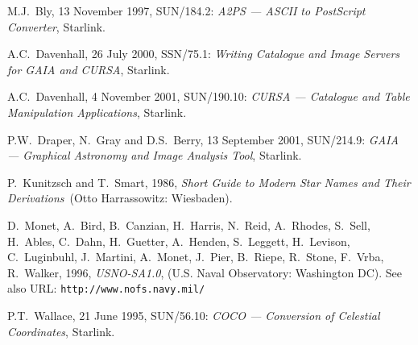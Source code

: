 \documentclass[twoside,11pt]{article}
\newcommand{\htmladdnormallink}[2]{#1}
\newcommand{\xref}[3]{#1}
\renewcommand{\_}{\texttt{\symbol{95}}}
\begin{document}
% 
{}
\begin{thebibliography}{99}

   M.J.~Bly, 13 November 1997,
   \xref{SUN/184.2}{sun184}{}: {\it A2PS --- ASCII to PostScript Converter},
   Starlink.

   A.C.~Davenhall, 26 July 2000,
   \xref{SSN/75.1}{ssn75}{}: {\it Writing Catalogue and Image Servers for
   GAIA and CURSA}, Starlink.

   A.C.~Davenhall, 4 November 2001,
   \xref{SUN/190.10}{sun190}{}: {\it CURSA --- Catalogue and Table
   Manipulation Applications}, Starlink.

   P.W.~Draper, N.~Gray and D.S.~Berry, 13 September 2001,
   \xref{SUN/214.9}{sun214}{}: {\it GAIA --- Graphical Astronomy and
   Image Analysis Tool}, Starlink.

   P.~Kunitzsch and T.~Smart, 1986, {\it Short
   Guide to Modern Star Names and Their Derivations}\, (Otto Harrassowitz:
   Wiesbaden).

   D.~Monet, A.~Bird, B.~Canzian, H.~Harris, N.~Reid,
   A.~Rhodes, S.~Sell, H.~Ables, C.~Dahn, H.~Guetter, A.~Henden,
   S.~Leggett, H.~Levison, C.~Luginbuhl, J.~Martini, A.~Monet, J.~Pier, 
   B.~Riepe, R.~Stone, F.~Vrba, R.~Walker,
   1996, {\it USNO-SA1.0}, (U.S. Naval Observatory: Washington DC). 
   See also URL: \htmladdnormallink{
   {\tt http://www.nofs.navy.mil/}}{http://www.nofs.navy.mil/}

   P.T.~Wallace, 21 June 1995,
   \xref{SUN/56.10}{sun56}{}: {\it COCO --- Conversion of Celestial
   Coordinates}, Starlink.

\end{thebibliography}

\typeout{  }
\typeout{*****************************************************}
\typeout{  }
\typeout{  }
\typeout{*****************************************************}
\typeout{  }
\end{document}
